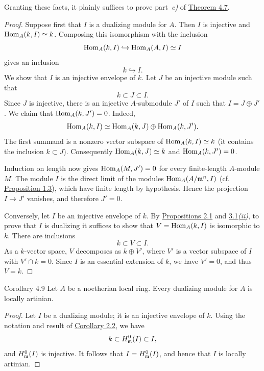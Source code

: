 Granting these facts, it plainly suffices to prove part~\emph{c)} of
\hyperref[IV.4.7]{Theorem 4.7}.

\begin{proof}
Suppose first that $I$ is a dualizing module for $A$. Then $I$ is injective
and $\operatorname{Hom}_A(k,I)\simeq k$. Composing this isomorphism with the inclusion
\[
  \operatorname{Hom}_A(k,I)\hookrightarrow\operatorname{Hom}_A(A,I)\simeq I
\]
gives an inclusion
\[
  k\hookrightarrow I.
\]
We show that $I$ is an injective envelope of $k$. Let $J$ be an injective
module such that
\[
  k\subset J\subset I.
\]
Since $J$ is injective, there is an injective $A$-submodule $J'$ of $I$ such
that $I=J\oplus J'$. We claim that $\operatorname{Hom}_A(k,J')=0$. Indeed,
\[
  \operatorname{Hom}_A(k,I)\simeq\operatorname{Hom}_A(k,J)\oplus\operatorname{Hom}_A(k,J').
\]
The first summand is a nonzero vector subspace of
$\operatorname{Hom}_A(k,I)\simeq k$ (it contains the inclusion $k\subset J$).
Consequently $\operatorname{Hom}_A(k,J)\simeq k$ and $\operatorname{Hom}_A(k,J')=0$.

Induction on length now gives $\operatorname{Hom}_A(M,J')=0$ for every finite-length
$A$-module $M$. The module $I$ is the direct limit of the modules
$\operatorname{Hom}_A(A/\mathfrak m^n,I)$ (cf. \hyperref[IV.1.3]{Proposition 1.3}), which have finite length by
hypothesis. Hence the projection $I\to J'$ vanishes, and therefore $J'=0$.

Conversely, let $I$ be an injective envelope of $k$. By \hyperref[IV.2.1]{Propositions 2.1}
and \hyperref[IV.3.1]{3.1\emph{(ii)}}, to prove that $I$ is dualizing it suffices to show that
$V=\operatorname{Hom}_A(k,I)$ is isomorphic to $k$. There are inclusions
\[
  k\subset V\subset I.
\]
As a $k$-vector space, $V$ decomposes as $k\oplus V'$, where $V'$ is a
vector subspace of $I$ with $V'\cap k=0$. Since $I$ is an essential
extension of $k$, we have $V'=0$, and thus $V=k$.
\end{proof}

\begin{sgastatement}{Corollary 4.9}
Let $A$ be a noetherian local ring. Every dualizing module for $A$ is
locally artinian.
\end{sgastatement}

\begin{proof}
Let $I$ be a dualizing module; it is an injective envelope of $k$. Using the
notation and result of \hyperref[IV.2.2]{Corollary 2.2}, we have
\[
  k\subset H^0_{\mathfrak m}(I)\subset I,
\]
and $H^0_{\mathfrak m}(I)$ is injective. It follows that
$I=H^0_{\mathfrak m}(I)$, and hence that $I$ is locally artinian.
\end{proof}


